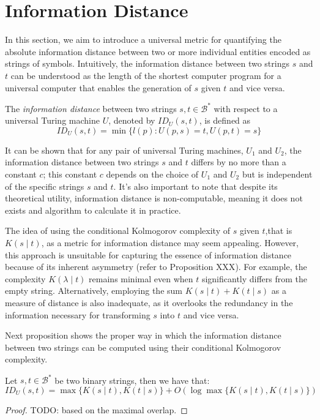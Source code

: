 \section{Information Distance}
\label{sec:information_distance}

In this section, we aim to introduce a universal metric for quantifying the absolute information distance between two or more individual entities encoded as strings of symbols. Intuitively, the information distance between two strings $s$ and $t$ can be understood as the length of the shortest computer program for a universal computer that enables the generation of $s$ given $t$ and vice versa.

\begin{definition}
The \emph{information distance} between two strings $s,  t \in \mathcal{B}^{\ast}$ with respect to a universal Turing machine $U$, denoted by $ID_U(s, t)$, is defined as
\[
ID_U(s, t) = \min \{ l(p) : U(p, s) = t, U(p, t) = s \}
\]
\end{definition}

It can be shown that for any pair of universal Turing machines, $U_1$ and $U_2$, the information distance between two strings $s$ and $t$ differs by no more than a constant $c$; this constant $c$ depends on the choice of $U_1$ and $U_2$ but is independent of the specific strings $s$ and $t$. It's also important to note that despite its theoretical utility, information distance is non-computable, meaning it does not exists and algorithm to calculate it in practice.

The idea of using the conditional Kolmogorov complexity of $s$ given $t$,that is $K(s \mid t)$, as a metric for information distance may seem appealing. However, this approach is unsuitable for capturing the essence of information distance because of its inherent asymmetry (refer to Proposition {\color{red} XXX}). For example, the complexity $K(\lambda \mid t)$ remains minimal even when $t$ significantly differs from the empty string. Alternatively, employing the sum $K(s \mid t) + K(t \mid s)$ as a measure of distance is also inadequate, as it overlooks the redundancy in the information necessary for transforming $s$ into $t$ and vice versa.

Next proposition shows the proper way in which the information distance between two strings can be computed using their conditional Kolmogorov complexity.

\begin{proposition}
Let $s,  t \in \mathcal{B}^{\ast}$ be two binary strings, then we have that:
\[
ID_U(s, t) = \max\{ K(s \mid t), K(t \mid s) \} + O ( \log \max\{ K(s \mid t), K(t \mid s) \}) 
\]
\end{proposition}
\begin{proof}
{\color{red} TODO: based on the maximal overlap.}
\end{proof}

